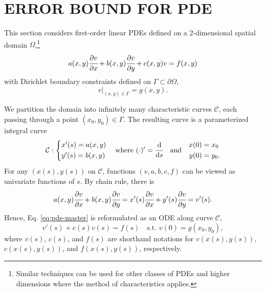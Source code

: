 \documentclass{uai2023}
\newcommand{\px}[1]{\cfrac{\partial #1}{\partial x}}
\newcommand{\py}[1]{\cfrac{\partial #1}{\partial y}}
\newcommand{\ds}[1]{\cfrac{\mathrm{d} #1}{\mathrm{d} s}}
\begin{document}
\section{ERROR BOUND FOR PDE} \label{section:error-bound-for-pde}
    This section considers first-order linear PDEs defined on a 2-dimensional spatial domain $\Omega$,\footnote{Similar techniques can be used for other classes of PDEs and higher dimensions where the method of characteristics applies.} 
    { 
        \small
        \begin{equation}\label{eq:pde-master}
            a(x, y) \px{v} + b(x, y) \py{v} + c(x, y)v = f(x, y)
        \end{equation}
    }
    with Dirichlet boundary constraints defined on $\Gamma \subset \partial \Omega$,
    {
        \small
        \begin{equation}\label{eq:pde-bc-master}
            v\big|_{(x, y) \in \Gamma} = g(x, y).
        \end{equation}
    }

    We partition the domain into infinitely many characteristic curves $\mathcal{C}$, each passing through a point $(x_0, y_0) \in \Gamma$. The resulting curve is a parameterized integral curve 
    {
        \small
        \begin{equation*} 
            \mathcal{C}: \begin{cases*}
                x'(s) = a(x, y) \\
                y'(s) = b(x, y) 
            \end{cases*} 
            \quad
            \text{where}
            \,\,
            (\cdot)' = \ds{}
            \quad
            \text{and} 
            \quad
            \begin{aligned}
                x(0) &= x_0 \\
                y(0) &= y_0.
            \end{aligned}
        \end{equation*}
    }
    For any $(x(s), y(s))$ on $\mathcal{C}$, functions $(v, a, b, c, f)$ can be viewed as univariate functions of $s$. By chain rule, there is
    {
        \small
        \begin{equation*}
            a(x, y)\px{v} + b(x, y)\py{v} = x'(s)\px{v}  + y'(s)\py{v} = v'(s).
        \end{equation*}
    }
    Hence, Eq. \ref{eq:pde-master} is reformulated as an ODE along curve $\mathcal{C}$,
    {
        \small
        \begin{equation}
            v'(s) + c(s) v(s) = f(s) \quad \text{s.t. } v(0) = g(x_0, y_0),
        \end{equation}
    }
    where $v(s)$, $c(s)$, and $f(s)$ are shorthand notations for $v(x(s),y(s))$, $c(x(s),y(s))$, and $f(x(s),y(s))$, respectively.
\end{document}
